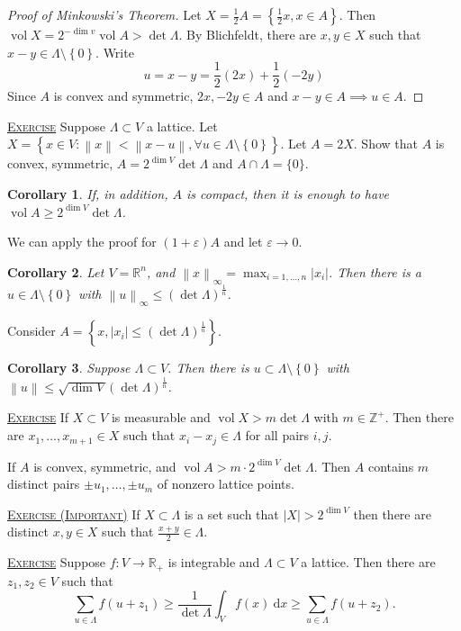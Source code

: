 \documentclass{report}
\newcommand{\R}{\mathbb{R}}
\newcommand{\Z}{\mathbb{Z}}
\newcommand{\vol}{\operatorname{vol}}
\newcommand{\df}{\mathrm{d}}
\newcommand{\norm}[1]{\left\| #1 \right\|}
\newcommand{\set}[1]{\left\{ #1 \right\}}
\newcommand{\fancyem}[1]{\underline{\textsc{#1}}}
\newtheorem{corollary}{Corollary}[section]
\theoremstyle{definition}
\theoremstyle{remark}
\numberwithin{equation}{section}
\begin{document}
\begin{proof}[Proof of Minkowski's Theorem]
    Let $X = \frac{1}{2}A = \set{\frac{1}{2}x, x \in A}$.
    Then $\vol X = 2^{-\dim v}\vol A > \det \Lambda$. By Blichfeldt, there are $x, y \in X$ such that $x - y \in \Lambda \setminus \set{0}$. Write \[u = x - y = \frac{1}{2}(2x) + \frac{1}{2}(-2y)\]
    Since $A$ is convex and symmetric, $2x, -2y \in A$ and $x - y \in A \implies u \in A$.
\end{proof}

\fancyem{Exercise} Suppose $\Lambda \subset V$ a lattice. Let $X = \set{x \in V: \norm{x} < \norm{x - u}, \forall u \in \Lambda \setminus \set{0}}$. Let $A = 2X$. Show that $A$ is convex, symmetric, $A = 2^{\dim V} \det \Lambda$ and $ A \cap \Lambda = \{0\}$.

\begin{corollary}
    If, in addition, $A$ is compact, then it is enough to have $\vol A \geq 2^{\dim V} \det \Lambda$.
\end{corollary}
We can apply the proof for $(1 + \varepsilon)A$ and let $\varepsilon \to 0$.

\begin{corollary}
    Let $V = \R^n$, and $\norm{x}_\infty = \max_{i=1, \ldots, n} |x_i|$. Then there is a $u \in \Lambda \setminus \set{0}$ with $\norm{u}_\infty \leq (\det \Lambda)^{\frac{1}{n}}$.
\end{corollary}
Consider $A = \set{x, |x_i| \leq (\det \Lambda)^{\frac{1}{n}}}$.
\begin{corollary}
    Suppose $\Lambda \subset V$. Then there is $u \subset \Lambda \setminus \set{0}$ with $\norm{u} \leq \sqrt{\dim V}(\det \Lambda)^{\frac{1}{n}}$.
\end{corollary}

\fancyem{Exercise} If $X \subset V$ is measurable and $\vol X > m\det \Lambda$ with $m \in \Z^+$. Then there are $x_1, \ldots, x_{m+1} \in X$ such that $x_i - x_j \in \Lambda$ for all pairs $i, j$.

If $A$ is convex, symmetric, and $\vol A > m \cdot 2^{\dim V} \det \Lambda$. Then $A$ contains $m$ distinct pairs $\pm u_1, \ldots, \pm u_m$ of nonzero lattice points.

\fancyem{Exercise (Important)} If $X \subset \Lambda$ is a set such that $|X| > 2^{\dim V}$ then there are distinct $x, y \in X$ such that $\frac{x+y}{2} \in \Lambda$.

\fancyem{Exercise} Suppose $f: V \to \R_+$ is integrable and $\Lambda \subset V$ a lattice. Then there are $z_1, z_2 \in V$ such that \[\sum_{u \in \Lambda} f(u+z_1) \geq \frac{1}{\det\Lambda}\int_V f(x)\ \df x \geq \sum_{u \in \Lambda}f(u+z_2).\]
\end{document}
